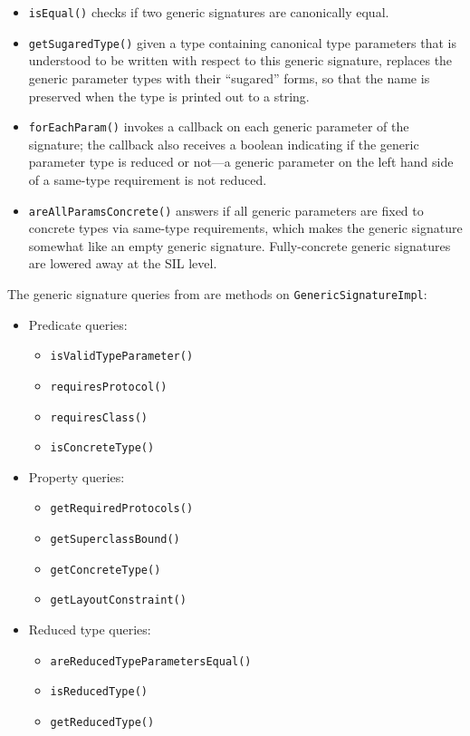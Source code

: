 \documentclass[../generics]{subfiles}
\begin{document}
\begin{itemize}
\item \texttt{isEqual()} checks if two generic signatures are canonically equal.
\item \texttt{getSugaredType()} given a type containing canonical type parameters that is understood to be written with respect to this generic signature, replaces the generic parameter types with their ``sugared'' forms, so that the name is preserved when the type is printed out to a string.
\item \texttt{forEachParam()} invokes a callback on each generic parameter of the signature; the callback also receives a boolean indicating if the generic parameter type is reduced or not---a generic parameter on the left hand side of a same-type requirement is not reduced.
\item \texttt{areAllParamsConcrete()} answers if all generic parameters are fixed to concrete types via same-type requirements, which makes the generic signature somewhat like an empty generic signature. Fully-concrete generic signatures are lowered away at the SIL level.
\end{itemize}
The generic signature queries from  are methods on \texttt{GenericSignatureImpl}:
\begin{itemize}
\item Predicate queries:
\begin{itemize}
\item \texttt{isValidTypeParameter()}
\item \texttt{requiresProtocol()}
\item \texttt{requiresClass()}
\item \texttt{isConcreteType()}
\end{itemize}
\item Property queries:
\begin{itemize}
\item \texttt{getRequiredProtocols()}
\item \texttt{getSuperclassBound()}
\item \texttt{getConcreteType()}
\item \texttt{getLayoutConstraint()}
\end{itemize}
\item Reduced type queries:
\begin{itemize}
\item \texttt{areReducedTypeParametersEqual()}
\item \texttt{isReducedType()}
\item \texttt{getReducedType()}
\end{itemize}
\end{itemize}
\end{document}
